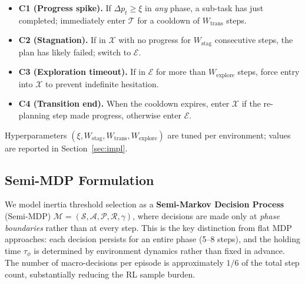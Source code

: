\documentclass[runningheads]{llncs}
\begin{document}
\begin{itemize}
  \item \textbf{C1 (Progress spike).} If $\Delta p_t \ge \xi$ in \emph{any} phase, a sub-task has just completed; immediately enter $\mathcal{T}$ for a cooldown of $W_{\mathrm{trans}}$ steps.
  \item \textbf{C2 (Stagnation).} If in $\mathcal{X}$ with no progress for $W_{\mathrm{stag}}$ consecutive steps, the plan has likely failed; switch to $\mathcal{E}$.
  \item \textbf{C3 (Exploration timeout).} If in $\mathcal{E}$ for more than $W_{\mathrm{explore}}$ steps, force entry into $\mathcal{X}$ to prevent indefinite hesitation.
  \item \textbf{C4 (Transition end).} When the cooldown expires, enter $\mathcal{X}$ if the re-planning step made progress, otherwise enter $\mathcal{E}$.
\end{itemize}

Hyperparameters $(\xi, W_{\mathrm{stag}}, W_{\mathrm{trans}}, W_{\mathrm{explore}})$ are tuned per environment; values are reported in Section~\ref{sec:impl}.


\subsection{Semi-MDP Formulation}
\label{sec:smdp}
We model inertia threshold selection as a \textbf{Semi-Markov Decision Process} (Semi-MDP) $\mathcal{M}=(\mathcal{S},\mathcal{A},\mathcal{P},\mathcal{R},\gamma)$, where decisions are made only at \emph{phase boundaries} rather than at every step.
This is the key distinction from flat MDP approaches: each decision persists for an entire phase (5--8 steps), and the holding time $\tau_\phi$ is determined by environment dynamics rather than fixed in advance.
The number of macro-decisions per episode is approximately $1/6$ of the total step count, substantially reducing the RL sample burden.
\end{document}

